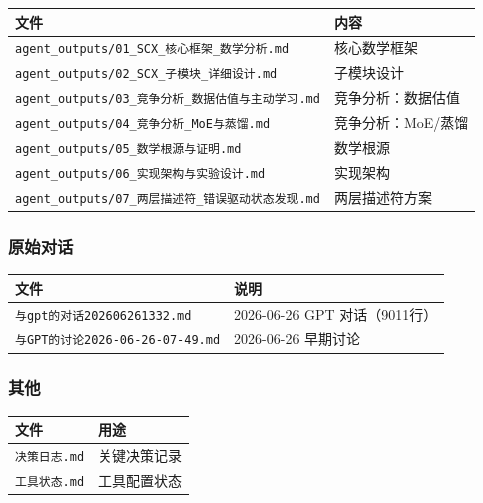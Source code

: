 \documentclass[
  12pt,
]{ctexart}
\begin{document}
\begin{longtable}[]{@{}
  >{\raggedright\arraybackslash}p{}
  >{\raggedright\arraybackslash}p{}@{}}
\toprule\noalign{}
\begin{minipage}[b]{\linewidth}\raggedright
文件
\end{minipage} & \begin{minipage}[b]{\linewidth}\raggedright
内容
\end{minipage} \\
\midrule\noalign{}
\endhead
\bottomrule\noalign{}
\endlastfoot
\texttt{agent\_outputs/01\_SCX\_核心框架\_数学分析.md} & 核心数学框架 \\
\texttt{agent\_outputs/02\_SCX\_子模块\_详细设计.md} & 子模块设计 \\
\texttt{agent\_outputs/03\_竞争分析\_数据估值与主动学习.md} &
竞争分析：数据估值 \\
\texttt{agent\_outputs/04\_竞争分析\_MoE与蒸馏.md} &
竞争分析：MoE/蒸馏 \\
\texttt{agent\_outputs/05\_数学根源与证明.md} & 数学根源 \\
\texttt{agent\_outputs/06\_实现架构与实验设计.md} & 实现架构 \\
\texttt{agent\_outputs/07\_两层描述符\_错误驱动状态发现.md} &
两层描述符方案 \\
\end{longtable}

\subsubsection{原始对话}\label{ux539fux59cbux5bf9ux8bdd}

\begin{longtable}[]{@{}ll@{}}
\toprule\noalign{}
文件 & 说明 \\
\midrule\noalign{}
\endhead
\bottomrule\noalign{}
\endlastfoot
\texttt{与gpt的对话202606261332.md} & 2026-06-26 GPT 对话（9011行） \\
\texttt{与GPT的讨论2026-06-26-07-49.md} & 2026-06-26 早期讨论 \\
\end{longtable}

\subsubsection{其他}\label{ux5176ux4ed6}

\begin{longtable}[]{@{}ll@{}}
\toprule\noalign{}
文件 & 用途 \\
\midrule\noalign{}
\endhead
\bottomrule\noalign{}
\endlastfoot
\texttt{决策日志.md} & 关键决策记录 \\
\texttt{工具状态.md} & 工具配置状态 \\
\end{longtable}
\end{document}
